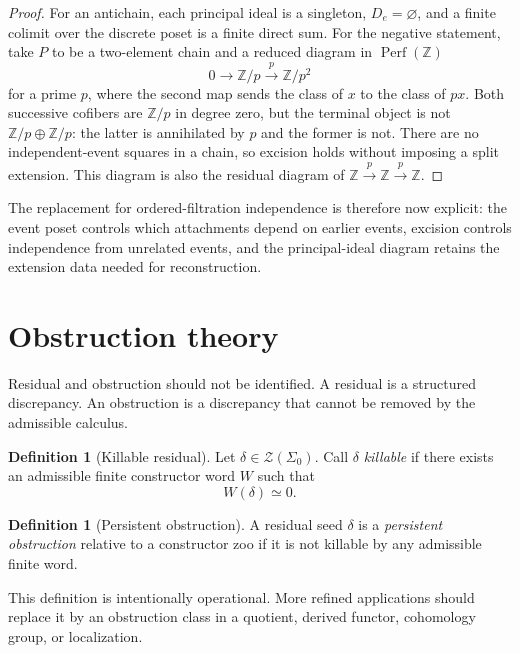 \documentclass[11pt]{article}
\theoremstyle{definition}
\newtheorem{definition}[theorem]{Definition}
\theoremstyle{remark}
\newcommand{\Zoo}{\mathcal Z}
\newcommand{\Seeds}{\Sigma}
\begin{document}
\begin{proof}
For an antichain, each principal ideal is a singleton, $D_e=\varnothing$, and a finite colimit over the discrete poset is a finite direct sum. For the negative statement, take $P$ to be a two-element chain and a reduced diagram in $\operatorname{Perf}(\mathbb Z)$
\[
 0\longrightarrow\mathbb Z/p\xrightarrow{\,p\,}\mathbb Z/p^2
\]
for a prime $p$, where the second map sends the class of $x$ to the class of $px$. Both successive cofibers are $\mathbb Z/p$ in degree zero, but the terminal object is not $\mathbb Z/p\oplus\mathbb Z/p$: the latter is annihilated by $p$ and the former is not. There are no independent-event squares in a chain, so excision holds without imposing a split extension. This diagram is also the residual diagram of $\mathbb Z\xrightarrow{p}\mathbb Z\xrightarrow{p}\mathbb Z$.
\end{proof}

The replacement for ordered-filtration independence is therefore now explicit: the event poset controls which attachments depend on earlier events, excision controls independence from unrelated events, and the principal-ideal diagram retains the extension data needed for reconstruction.


\section{Obstruction theory}

Residual and obstruction should not be identified. A residual is a structured discrepancy. An obstruction is a discrepancy that cannot be removed by the admissible calculus.

\begin{definition}[Killable residual]
Let $\delta\in\Zoo(\Seeds_0)$. Call $\delta$ \emph{killable} if there exists an admissible finite constructor word $W$ such that
\[
W(\delta)\simeq0.
\]
\end{definition}

\begin{definition}[Persistent obstruction]
A residual seed $\delta$ is a \emph{persistent obstruction} relative to a constructor zoo if it is not killable by any admissible finite word.
\end{definition}

This definition is intentionally operational. More refined applications should replace it by an obstruction class in a quotient, derived functor, cohomology group, or localization.
\end{document}
